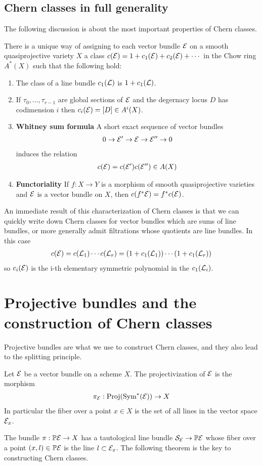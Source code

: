 \documentclass[12pt]{article}
\begin{document}
\subsection{Chern classes in full generality}
The following discussion is about the most important properties of Chern classes.
\begin{theorem}
    There is a unique way of assigning to each vector bundle ${\mathcal{E}}$ on a smooth quasiprojective variety $X$ 
    a class $c({\mathcal{E}}) = 1 + c_1({\mathcal{E}}) + c_2({\mathcal{E}}) + \cdots$ in the Chow ring $A^*(X)$ such that the following hold:
    \begin{enumerate}
        \item The class of a line bundle $c_1({\mathcal{L}})$ is $1 + c_1({\mathcal{L}})$.
        \item If $\tau_0,\dots,\tau_{r-1}$ are global sections of ${\mathcal{E}}$ and the degernacy locus $D$ has codimension $i$
        then $c_i({\mathcal{E}}) = [D] \in A^i(X)$.
        \item \textbf{Whitney sum formula} A short exact sequence of vector bundles \begin{align*}
            0 \to {\mathcal{E}}' \to {\mathcal{E}} \to {\mathcal{E}}'' \to 0
        \end{align*} induces the relation \begin{align*}
            c({\mathcal{E}}) = c({\mathcal{E}}')c({\mathcal{E}}'') \in A(X)
        \end{align*}
        \item \textbf{Functoriality} If $f:X\to Y$ is a morphism of smooth quasiprojective varieties
        and ${\mathcal{E}}$ is a vector bundle on $X$, then $c(f^*{\mathcal{E}}) = f^*c({\mathcal{E}})$.
    \end{enumerate}
\end{theorem}

An immediate result of this characterization of Chern classes is that we can quickly write down 
Chern classes for vector bundles which are sums of line bundles, or more generally admit
filtrations whose quotients are line bundles. In this case \begin{align*}
    c({\mathcal{E}}) = c({\mathcal{L}}_1)\cdots c({\mathcal{L}}_r) = (1+c_1({\mathcal{L}}_1))\cdots (1+c_1({\mathcal{L}}_r))
\end{align*} so $c_i({\mathcal{E}})$ is the i-th elementary symmetric polynomial in the $c_1({\mathcal{L}}_i)$.

\section{Projective bundles and the construction of Chern classes}
Projective bundles are what we use to construct Chern classes, and they also lead to the splitting principle.
\begin{definition}
    Let ${\mathcal{E}}$ be a vector bundle on a scheme $X$. The projectivization of ${\mathcal{E}}$ is the morphism \begin{align*}
        \pi_{{\mathcal{E}}}:\operatorname{Proj}(\operatorname{Sym}^*({\mathcal{E}})) \to X
    \end{align*} In particular the fiber over a point $x\in X$ is the set of all lines in the vector space ${\mathcal{E}}_x$.
\end{definition}
The bundle $\pi:\mathbb{P}{\mathcal{E}}\to X$ has a tautological line bundle ${\mathcal{S}}_{\mathcal{E}} \to \mathbb{P}{\mathcal{E}}$ whose fiber
over a point $(x,l) \in \mathbb{P}{\mathcal{E}}$ is the line $l\subset {\mathcal{E}}_x$. The following theorem
is the key to constructing Chern classes.
\end{document}
